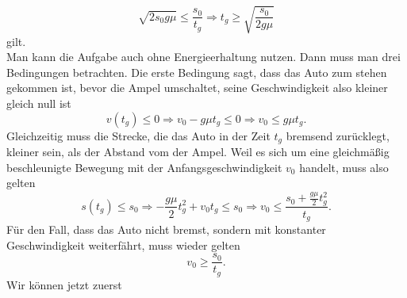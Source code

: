 \begin{Answer}[ref = ampel]
\begin{equation}
	\boxed{
	\sqrt{2s_0g\mu} \leq \frac{s_0}{t_g} \Rightarrow t_g \geq  \sqrt{\frac{s_0}{2g\mu}}}
	\end{equation}
	gilt.\\
	Man kann die Aufgabe auch ohne Energieerhaltung nutzen. Dann muss man drei Bedingungen betrachten. Die erste Bedingung sagt, dass das Auto zum stehen gekommen ist, bevor die Ampel umschaltet, seine Geschwindigkeit also kleiner gleich null ist
	\begin{equation}\label{traff:cond1}
		v\left(t_g\right)\leq 0 \Rightarrow v_0 - g\mu t_g \leq 0 \Rightarrow v_0 \leq g \mu t_g.
	\end{equation}
	Gleichzeitig muss die Strecke, die das Auto in der Zeit $t_g$ bremsend zurücklegt, kleiner sein, als der Abstand vom der Ampel. Weil es sich um eine gleichmäßig beschleunigte Bewegung mit der Anfangsgeschwindigkeit $v_0$ handelt, muss also gelten
	\begin{equation}\label{traff:cond2}
	s\left(t_g\right) \leq s_0 \Rightarrow	-\frac{g\mu}{2}t_g^2+v_0t_g \leq s_0 \Rightarrow v_0 \leq \frac{s_0+\frac{g\mu}{2}t_g^2}{t_g}.
	\end{equation}
	Für den Fall, dass das Auto nicht bremst, sondern mit konstanter Geschwindigkeit weiterfährt, muss wieder gelten
	\begin{equation}\label{traff:cond3}
		v_0 \geq \frac{s_0}{t_g}.
	\end{equation}
	Wir können jetzt zuerst 
\end{Answer}